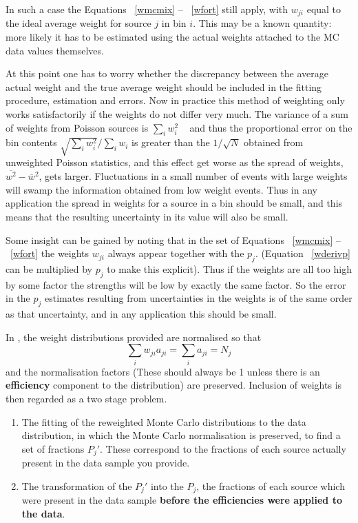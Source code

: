 \begin{changebar}
In such a case the Equations ~\ref{wmcmix} -- ~\ref{wfort} still apply,
with $w_{ji}$ equal to the ideal average weight for source $j$ in bin $i$.
This may be a known quantity: more likely it has to be estimated using
the actual weights attached to the MC data values themselves.
 
At this point one has to worry whether the discrepancy between the
average actual weight and the true average weight should be
included in the fitting procedure, estimation and errors.
Now in practice this method of weighting only works satisfactorily if
the weights do not differ very much.   The variance of a sum of weights
from Poisson sources is $\sum_i w_i^2$ ~\cite{bib-WEIGHTS} and thus
the proportional error on the bin contents
$\sqrt{\sum_i w_i^2}/\sum_i w_i$ is greater than
the $1/\sqrt{N}$ obtained from unweighted Poisson statistics, and this
effect get worse as the spread of weights, $\overline{w^2} - \overline w ^2$,
gets larger.   Fluctuations in a small number of events with large weights
will swamp the information obtained from low weight events.
Thus in any application the
spread in weights for a source in a bin should be small, and
this means that the resulting uncertainty in its value will also be small.
 
Some insight can be gained by noting that in the set of Equations
~\ref{wmcmix} -- ~\ref{wfort} the
weights $w_{ji}$ always appear together with the $p_j$.  (Equation
~\ref{wderivp} can be multiplied by $p_j$ to make this explicit).  Thus if the
weights are all too high by some factor the
strengths will be low by exactly the same factor.   So the error in the $p_j$
estimates
resulting from uncertainties in the weights
is of the same order as that uncertainty, and in any application
this should be small.
 
In , the weight distributions provided are normalised
so that
$$\sum_i w_{ji}a_{ji} = \sum_i a_{ji} = N_{j}$$
 and the
normalisation factors (These should always be 1 unless there is an
{\bf efficiency} component to the distribution) are preserved.  Inclusion
of weights is then regarded as a two stage problem.
\begin{enumerate}
\item  The fitting
of the reweighted Monte Carlo distributions to the data distribution, in
which the Monte Carlo normalisation is preserved, to find a set of fractions
$P_{j}\prime$.  These correspond to the fractions of each source
actually present in the data sample you provide.
\item The transformation of the $P_{j}\prime$ into the $P_j$, the fractions
of each source which were present in the data sample {\bf before the
efficiencies were applied to the data}.
\end{enumerate}
 

\end{changebar}
